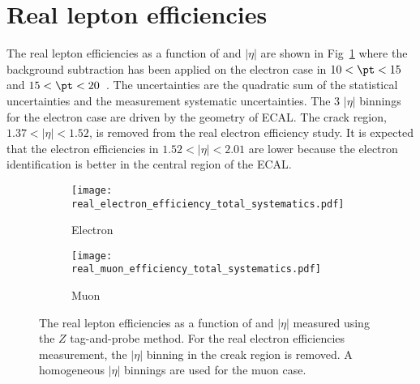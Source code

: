 
\section{Real lepton efficiencies}
\label{sec:app_RLE}
The real lepton efficiencies as a function of \pt and $|\eta|$ are shown in Fig~\ref{fig:app_RLE_real_efficiency_total_systematics} where the background subtraction has been applied on the electron case in $10 < \pt < 15$~{\GeV} and $15 < \pt < 20$~{\GeV}.
The uncertainties are the quadratic sum of the statistical uncertainties and the measurement systematic uncertainties.
The 3 $|\eta|$ binnings for the electron case are driven by the geometry of ECAL.
The crack region, $1.37<|\eta|<1.52$, is removed from the real electron efficiency study.
It is expected that the electron efficiencies in $1.52<|\eta|<2.01$ are lower because the electron identification is better in the central region of the ECAL.

\begin{figure}[htbp]
    \begin{subfigure}[b]{0.48\textwidth}
        \begin{center}
            \texttt{[image: real\_electron\_efficiency\_total\_systematics.pdf]}
            \caption{Electron}
        \end{center}
    \end{subfigure}
    \begin{subfigure}[b]{0.48\textwidth}
        \begin{center}
            \texttt{[image: real\_muon\_efficiency\_total\_systematics.pdf]}
            \caption{Muon}
        \end{center}
    \end{subfigure}
    \caption{The real lepton efficiencies as a function of \pt and $|\eta|$ measured using the $Z$ tag-and-probe method.
    For the real electron efficiencies measurement, the $|\eta|$ binning in the creak region is removed.
    A homogeneous $|\eta|$ binnings are used for the muon case.}
    \label{fig:app_RLE_real_efficiency_total_systematics}
\end{figure}


